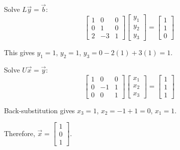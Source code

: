 \documentclass[reqno, answers]{exam}
\begin{document}
\begin{questions}
\begin{solution}
    Solve $L\vec{y} = \vec{b}$:
    $$\begin{bmatrix} 1 & 0 & 0 \\ 0 & 1 & 0 \\ 2 & -3 & 1 \end{bmatrix} \begin{bmatrix} y_1 \\ y_2 \\ y_3 \end{bmatrix} = \begin{bmatrix} 1 \\ 1 \\ 0 \end{bmatrix}$$
    
    This gives $y_1 = 1$, $y_2 = 1$, $y_3 = 0 - 2(1) + 3(1) = 1$.

    Solve $U\vec{x} = \vec{y}$:
    $$\begin{bmatrix} 1 & 0 & 0 \\ 0 & -1 & 1 \\ 0 & 0 & 1 \end{bmatrix} \begin{bmatrix} x_1 \\ x_2 \\ x_3 \end{bmatrix} = \begin{bmatrix} 1 \\ 1 \\ 1 \end{bmatrix}$$
    
    Back-substitution gives $x_3 = 1$, $x_2 = -1 + 1 = 0$, $x_1 = 1$.
    
    Therefore, $\vec{x} = \begin{bmatrix} 1 \\ 0 \\ 1 \end{bmatrix}$.
  \end{solution}
  \newpage


\end{questions}
\end{document}
